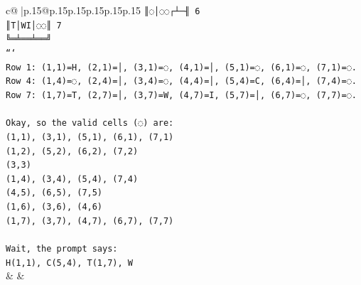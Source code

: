 \documentclass{article}
\begin{document}
{\begin{supertabular}{c@{$\;$}|p{.15\linewidth}@{}p{.15\linewidth}p{.15\linewidth}p{.15\linewidth}p{.15\linewidth}p{.15\linewidth}}
{{{\texttt{║◌│◌◌┌┴─╢ 6} \\
\texttt{║T│WI│◌◌║ 7} \\
\texttt{╚═╧══╧══╝} \\
\texttt{```} \\
\texttt{Row 1: (1,1)=H, (2,1)=│, (3,1)=◌, (4,1)=│, (5,1)=◌, (6,1)=◌, (7,1)=◌.} \\
\texttt{Row 4: (1,4)=◌, (2,4)=│, (3,4)=◌, (4,4)=│, (5,4)=C, (6,4)=│, (7,4)=◌.} \\
\texttt{Row 7: (1,7)=T, (2,7)=│, (3,7)=W, (4,7)=I, (5,7)=│, (6,7)=◌, (7,7)=◌.} \\
\\ 
\texttt{Okay, so the valid cells (◌) are:} \\
\texttt{(1,1), (3,1), (5,1), (6,1), (7,1)} \\
\texttt{(1,2), (5,2), (6,2), (7,2)} \\
\texttt{(3,3)} \\
\texttt{(1,4), (3,4), (5,4), (7,4)} \\
\texttt{(4,5), (6,5), (7,5)} \\
\texttt{(1,6), (3,6), (4,6)} \\
\texttt{(1,7), (3,7), (4,7), (6,7), (7,7)} \\
\\ 
\texttt{Wait, the prompt says:} \\
\texttt{H(1,1), C(5,4), T(1,7), W} \\
            }
        }
    }
    & & \\ \\


\end{supertabular}}
\end{document}
